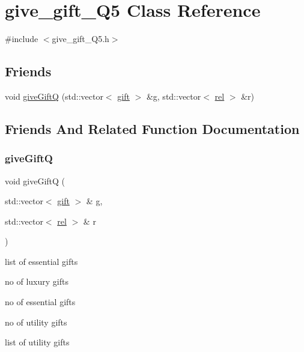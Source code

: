 \hypertarget{classgive__gift___q5}{}\section{give\+\_\+gift\+\_\+\+Q5 Class Reference}
\label{classgive__gift___q5}


{\ttfamily \#include $<$give\+\_\+gift\+\_\+\+Q5.\+h$>$}

\subsection*{Friends}
\begin{DoxyCompactItemize}
\item 
void \hyperlink{classgive__gift___q5_abad76b5070a0fdf9d34a475880a6a778}{give\+GiftQ} (std\+::vector$<$ \hyperlink{classgift}{gift} $>$ \&g, std\+::vector$<$ \hyperlink{classrel}{rel} $>$ \&r)
\end{DoxyCompactItemize}


\subsection{Friends And Related Function Documentation}
\mbox{\label{classgive__gift___q5_abad76b5070a0fdf9d34a475880a6a778}} 
\subsubsection{\texorpdfstring{give\+GiftQ}{giveGiftQ}}
{\footnotesize\ttfamily void give\+GiftQ (\begin{DoxyParamCaption}\item[{std\+::vector$<$ \hyperlink{classgift}{gift} $>$ \&}]{g,  }\item[{std\+::vector$<$ \hyperlink{classrel}{rel} $>$ \&}]{r }\end{DoxyParamCaption})\hspace{0.3cm}{\ttfamily [friend]}}

list of essential gifts

no of luxury gifts

no of essential gifts

no of utility gifts

list of utility gifts


